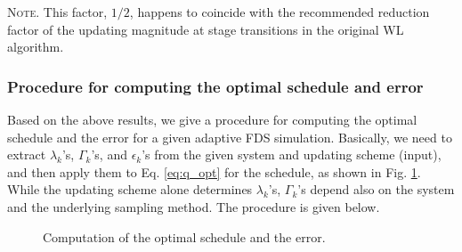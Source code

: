 \documentclass[preprint, superscriptaddress, floatfix]{revtex4-1}
\newcommand{\note}[1]{{\color{DarkGreen}\footnotesize \textsc{Note.} #1}}
\begin{document}
\note{This factor, $1/2$,
  happens to coincide with the
  recommended reduction factor of the updating magnitude
  at stage transitions
  in the original WL algorithm\cite{
  wang2001, wang2001pre}.  }%



\subsubsection{\label{sec:procedure}
Procedure for computing the optimal schedule and error
}



Based on the above results,
we give a procedure for computing
the optimal schedule and the error
for a given adaptive FDS simulation.
%
Basically, we need to extract
$\lambda_k$'s, $\Gamma_k$'s, and $\epsilon_k$'s
from the given system and updating scheme (input),
and then apply them to Eq. \eqref{eq:q_opt}
for the schedule,
as shown in Fig. \ref{fig:vardep}.
%
While the updating scheme alone
determines $\lambda_k$'s,
$\Gamma_k$'s depend also on the system
and the underlying sampling method.
%
The procedure is given below.

\begin{figure}[h]\centering
  \caption{
    \label{fig:vardep}
    Computation of the optimal schedule and the error.
  }
\end{figure}
\end{document}
